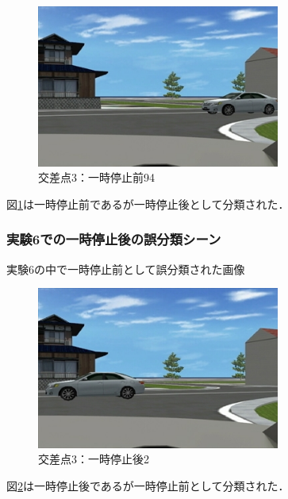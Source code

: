 \begin{figure}[htbp]
  \begin{center}
    \includegraphics[clip,width=8.0cm]{./images/ds3stop094.png}
    \caption{交差点3：一時停止前94}
    \label{fig:ds3stop94}
  \end{center}
\end{figure}

図\ref{fig:ds3stop94}は一時停止前であるが一時停止後として分類された．\\


\newpage

\subsubsection*{実験6での一時停止後の誤分類シーン}
実験6の中で一時停止前として誤分類された画像\\

\begin{figure}[htbp]
  \begin{center}
    \includegraphics[clip,width=8.0cm]{./images/ds3turn002.png}
    \caption{交差点3：一時停止後2}
    \label{fig:ds3turn2}
  \end{center}
\end{figure}

図\ref{fig:ds3turn2}は一時停止後であるが一時停止前として分類された．\\


